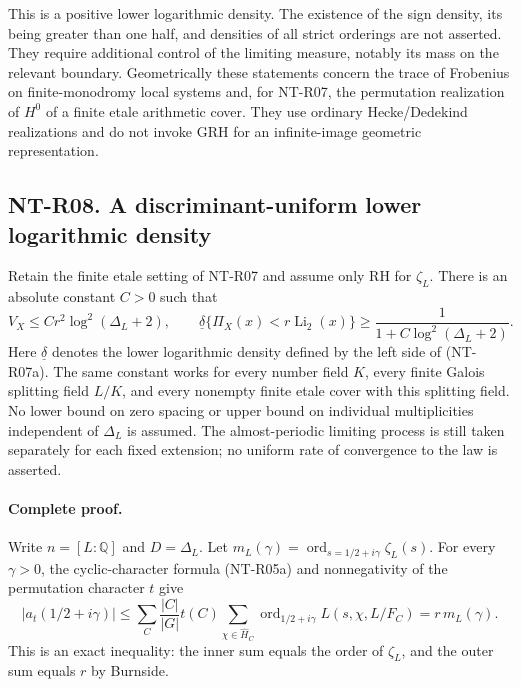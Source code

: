 This is a positive lower logarithmic density. The existence of the
sign density, its being greater than one half, and densities of all
strict orderings are not asserted. They require additional control
of the limiting measure, notably its mass on the relevant boundary.
Geometrically these statements concern the trace of Frobenius on
finite-monodromy local systems and, for NT-R07, the permutation
realization of $H^0$ of a finite etale arithmetic cover. They use
ordinary Hecke/Dedekind realizations and do not invoke GRH for an
infinite-image geometric representation.

\subsection*{NT-R08. A discriminant-uniform lower logarithmic density}

Retain the finite etale setting of NT-R07 and assume only RH for
$\zeta_L$. There is an absolute constant $C>0$ such that
\[
 V_X\le C r^2\log^2(\Delta_L+2),\qquad
 \underline\delta\{\Pi_X(x)<r\operatorname{Li}_2(x)\}
 \ge \frac1{1+C\log^2(\Delta_L+2)}.
 \tag{NT-R08a}
\]
Here $\underline\delta$ denotes the lower logarithmic density
defined by the left side of (NT-R07a). The same constant works
for every number field $K$, every finite Galois splitting field
$L/K$, and every nonempty finite etale cover with this splitting
field. No lower bound on zero spacing or upper bound on individual
multiplicities independent of $\Delta_L$ is assumed. The
almost-periodic limiting process is still taken separately for
each fixed extension; no uniform rate of convergence to the law
is asserted.

\paragraph{Complete proof.}
Write $n=[L:\mathbb Q]$ and $D=\Delta_L$. Let
$m_L(\gamma)=\operatorname{ord}_{s=1/2+i\gamma}\zeta_L(s)$.
For every $\gamma>0$, the cyclic-character formula (NT-R05a)
and nonnegativity of the permutation character $t$ give
\[
 |a_t(1/2+i\gamma)|
 \le\sum_C\frac{|C|}{|G|}t(C)
       \sum_{\chi\in\widehat H_C}
          \operatorname{ord}_{1/2+i\gamma}L(s,\chi,L/F_C)
 =r\,m_L(\gamma).
 \tag{NT-R08b}
\]
This is an exact inequality: the inner sum equals the order
of $\zeta_L$, and the outer sum equals $r$ by Burnside.

